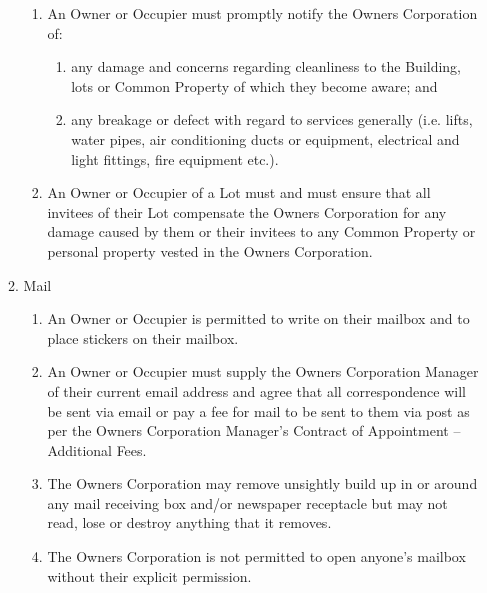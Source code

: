 \documentclass{article}
\begin{document}
\begin{enumerate}[label=\arabic*.]
\begin{enumerate}[label=\arabic{enumi}.\arabic*.]
\begin{enumerate}[label=(\arabic*)]
\item  An Owner or Occupier must promptly notify the Owners Corporation of:

\begin{enumerate}[label=(\alph*)]

\item  any damage and concerns regarding cleanliness to the Building, lots or Common Property of which they become aware; and

\item  any breakage or defect with regard to services generally (i.e. lifts, water pipes, air conditioning ducts or equipment, electrical and light fittings, fire equipment etc.).

\end{enumerate}

\item  An Owner or Occupier of a Lot must and must ensure that all invitees of their Lot compensate the Owners Corporation for any damage caused by them or their invitees to any Common Property or personal property vested in the Owners Corporation.

\end{enumerate}

\item  Mail

\begin{enumerate}[label=(\arabic*)]

\item An Owner or Occupier is permitted to write on their mailbox and to place stickers on their mailbox.

\newpage

\item  An Owner or Occupier must supply the Owners Corporation Manager of their current email address and agree that all correspondence will be sent via email or pay a fee for mail to be sent to them via post as per the Owners Corporation Manager’s Contract of Appointment – Additional Fees.

\item  The Owners Corporation may remove unsightly build up in or around any mail receiving box and/or newspaper receptacle but may not read, lose or destroy anything that it removes.

\item The Owners Corporation is not permitted to open anyone's mailbox without their explicit permission.

\end{enumerate}


\end{enumerate}
\end{enumerate}
\end{document}
